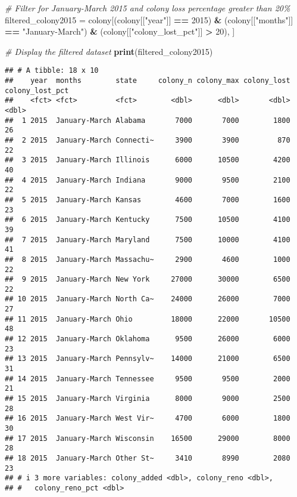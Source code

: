 \documentclass[
]{article}
\newenvironment{Shaded}{\begin{snugshade}}{\end{snugshade}}
\newcommand{\CommentTok}[1]{\textcolor[rgb]{0.56,0.35,0.01}{\textit{#1}}}
\newcommand{\DecValTok}[1]{\textcolor[rgb]{0.00,0.00,0.81}{#1}}
\newcommand{\FunctionTok}[1]{\textcolor[rgb]{0.13,0.29,0.53}{\textbf{#1}}}
\newcommand{\NormalTok}[1]{#1}
\newcommand{\OtherTok}[1]{\textcolor[rgb]{0.56,0.35,0.01}{#1}}
\newcommand{\SpecialCharTok}[1]{\textcolor[rgb]{0.81,0.36,0.00}{\textbf{#1}}}
\newcommand{\StringTok}[1]{\textcolor[rgb]{0.31,0.60,0.02}{#1}}
\begin{document}
\begin{Shaded}
\begin{Highlighting}[]
\CommentTok{\# Filter for January{-}March 2015 and colony loss percentage greater than 20\%}
\NormalTok{filtered\_colony2015 }\OtherTok{=}\NormalTok{ colony[(colony[[}\StringTok{"year"}\NormalTok{]] }\SpecialCharTok{==} \DecValTok{2015}\NormalTok{) }\SpecialCharTok{\&} 
\NormalTok{                        (colony[[}\StringTok{"months"}\NormalTok{]] }\SpecialCharTok{==} \StringTok{"January{-}March"}\NormalTok{) }\SpecialCharTok{\&} 
\NormalTok{                        (colony[[}\StringTok{"colony\_lost\_pct"}\NormalTok{]] }\SpecialCharTok{\textgreater{}} \DecValTok{20}\NormalTok{), ]}

\CommentTok{\# Display the filtered dataset}
\FunctionTok{print}\NormalTok{(filtered\_colony2015)}
\end{Highlighting}
\end{Shaded}

\begin{verbatim}
## # A tibble: 18 x 10
##    year  months        state     colony_n colony_max colony_lost colony_lost_pct
##    <fct> <fct>         <fct>        <dbl>      <dbl>       <dbl>           <dbl>
##  1 2015  January-March Alabama       7000       7000        1800              26
##  2 2015  January-March Connecti~     3900       3900         870              22
##  3 2015  January-March Illinois      6000      10500        4200              40
##  4 2015  January-March Indiana       9000       9500        2100              22
##  5 2015  January-March Kansas        4600       7000        1600              23
##  6 2015  January-March Kentucky      7500      10500        4100              39
##  7 2015  January-March Maryland      7500      10000        4100              41
##  8 2015  January-March Massachu~     2900       4600        1000              22
##  9 2015  January-March New York     27000      30000        6500              22
## 10 2015  January-March North Ca~    24000      26000        7000              27
## 11 2015  January-March Ohio         18000      22000       10500              48
## 12 2015  January-March Oklahoma      9500      26000        6000              23
## 13 2015  January-March Pennsylv~    14000      21000        6500              31
## 14 2015  January-March Tennessee     9500       9500        2000              21
## 15 2015  January-March Virginia      8000       9000        2500              28
## 16 2015  January-March West Vir~     4700       6000        1800              30
## 17 2015  January-March Wisconsin    16500      29000        8000              28
## 18 2015  January-March Other St~     3410       8990        2080              23
## # i 3 more variables: colony_added <dbl>, colony_reno <dbl>,
## #   colony_reno_pct <dbl>
\end{verbatim}
\end{document}

